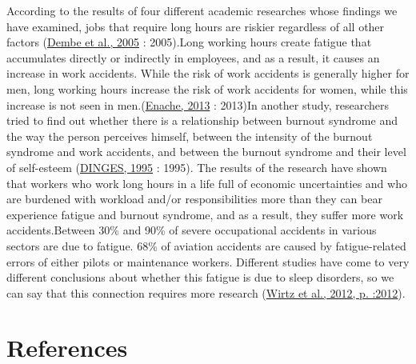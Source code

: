 \documentclass[
  12pt,
]{article}
\begin{document}
According to the results of four different academic researches whose findings we have examined, jobs that require long hours are riskier regardless of all other factors (\protect\hyperlink{ref-Dembe588}{Dembe et al., 2005} : 2005).Long working hours create fatigue that accumulates directly or indirectly in employees, and as a result, it causes an increase in work accidents. While the risk of work accidents is generally higher for men, long working hours increase the risk of work accidents for women, while this increase is not seen in men.(\protect\hyperlink{ref-ENACHE2013170}{Enache, 2013} : 2013)In another study, researchers tried to find out whether there is a relationship between burnout syndrome and the way the person perceives himself, between the intensity of the burnout syndrome and work accidents, and between the burnout syndrome and their level of self-esteem (\protect\hyperlink{ref-https:ux2fux2fdoi.orgux2f10.1111ux2fj.1365-2869.1995.tb00220.x}{DINGES, 1995} : 1995). The results of the research have shown that workers who work long hours in a life full of economic uncertainties and who are burdened with workload and/or responsibilities more than they can bear experience fatigue and burnout syndrome, and as a result, they suffer more work accidents.Between 30\% and 90\% of severe occupational accidents in various sectors are due to fatigue. 68\% of aviation accidents are caused by fatigue-related errors of either pilots or maintenance workers. Different studies have come to very different conclusions about whether this fatigue is due to sleep disorders, so we can say that this connection requires more research (\protect\hyperlink{ref-10.2307ux2f41508902}{Wirtz et al., 2012, p. :2012}).

\newpage

\hypertarget{references}{%
\section{References}\label{references}}
\end{document}
